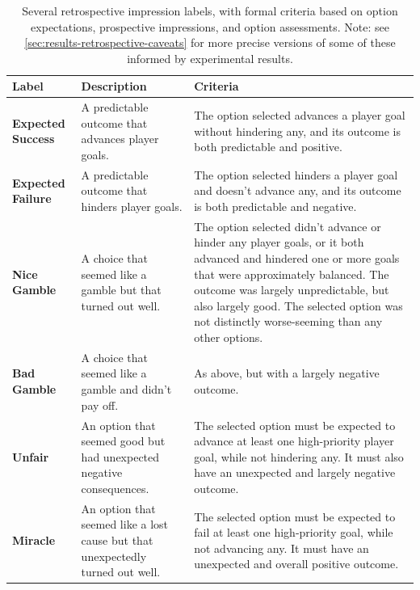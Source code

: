 \begin{table}[!p]
\begingroup
\renewcommand*{\arraystretch}{1.5}
\begin{tabular}{p{4.5em}p{14em}p{14.5em}}
\toprule
\textbf{Label} & \textbf{Description} & \textbf{Criteria} \\
\midrule
\textbf{Expected Success} & A predictable outcome that advances player goals. & The option selected advances a player goal without hindering any, and its outcome is both predictable and positive. \\
\textbf{Expected Failure} & A predictable outcome that hinders player goals. & The option selected hinders a player goal and doesn't advance any, and its outcome is both predictable and negative. \\
\textbf{Nice Gamble} & A choice that seemed like a gamble but that turned out well. & The option selected didn't advance or hinder any player goals, or it both advanced and hindered one or more goals that were approximately balanced. The outcome was largely unpredictable, but also largely good. The selected option was not distinctly worse-seeming than any other options. \\
\textbf{Bad Gamble} & A choice that seemed like a gamble and didn't pay off. & As above, but with a largely negative outcome. \\
\textbf{Unfair} & An option that seemed good but had unexpected negative consequences. & The selected option must be expected to advance at least one high-priority player goal, while not hindering any. It must also have an unexpected and largely negative outcome. \\
\textbf{Miracle} & An option that seemed like a lost cause but that unexpectedly turned out well. & The selected option must be expected to fail at least one high-priority goal, while not advancing any. It must have an unexpected and overall positive outcome. \\
\bottomrule
\end{tabular}
\endgroup
\caption[Retrospective outcome impressions]{Several retrospective impression labels, with formal criteria based on option expectations, prospective impressions, and option assessments. Note: see \cref{sec:results-retrospective-caveats} for more precise versions of some of these informed by experimental results.}
\label{tab:retrospective-impressions}
\end{table}


